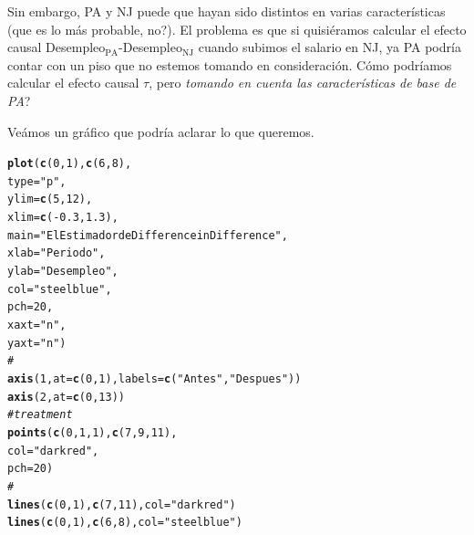 \documentclass[onesided]{article}\usepackage[]{graphicx}\usepackage[]{color}
\makeatletter
\newcommand{\hlnum}[1]{\textcolor[rgb]{0.686,0.059,0.569}{#1}}%
\newcommand{\hlstr}[1]{\textcolor[rgb]{0.192,0.494,0.8}{#1}}%
\newcommand{\hlcom}[1]{\textcolor[rgb]{0.678,0.584,0.686}{\textit{#1}}}%
\newcommand{\hlopt}[1]{\textcolor[rgb]{0,0,0}{#1}}%
\newcommand{\hlstd}[1]{\textcolor[rgb]{0.345,0.345,0.345}{#1}}%
\newcommand{\hlkwc}[1]{\textcolor[rgb]{0.333,0.667,0.333}{#1}}%
\newcommand{\hlkwd}[1]{\textcolor[rgb]{0.737,0.353,0.396}{\textbf{#1}}}%
\newenvironment{kframe}{%
 \def\at@end@of@kframe{}%
 \ifinner\ifhmode%
  \def\at@end@of@kframe{\end{minipage}}%
  \begin{minipage}{\columnwidth}%
 \fi\fi%
 \def\FrameCommand##1{\hskip\@totalleftmargin \hskip-\fboxsep
 \colorbox{shadecolor}{##1}\hskip-\fboxsep
     \hskip-\linewidth \hskip-\@totalleftmargin \hskip\columnwidth}%
 \MakeFramed {\advance\hsize-\width
   \@totalleftmargin\z@ \linewidth\hsize
   \@setminipage}}%
 {\par\unskip\endMakeFramed%
 \at@end@of@kframe}
\newenvironment{knitrout}{}{} %
\makeatother
\begin{document}
Sin embargo, PA y NJ puede que hayan sido distintos en varias caracter\'isticas (que es lo m\'as probable, no?). El problema es que si quisi\'eramos calcular el efecto causal Desempleo$_{\text{PA}}$-Desempleo$_{\text{NJ}}$ cuando subimos el salario en NJ, ya PA podr\'ia contar con un piso que no estemos tomando en consideraci\'on. C\'omo podr\'iamos calcular el efecto causal $\tau$, pero \emph{tomando en cuenta las caracter\'isticas de base de PA}?

Ve\'amos un gr\'afico que podr\'ia aclarar lo que queremos.

\begin{knitrout}
\color{fgcolor}\begin{kframe}
\begin{alltt}
\hlkwd{plot}\hlstd{(}\hlkwd{c}\hlstd{(}\hlnum{0}\hlstd{,} \hlnum{1}\hlstd{),} \hlkwd{c}\hlstd{(}\hlnum{6}\hlstd{,} \hlnum{8}\hlstd{),}
     \hlkwc{type} \hlstd{=} \hlstr{"p"}\hlstd{,}
     \hlkwc{ylim} \hlstd{=} \hlkwd{c}\hlstd{(}\hlnum{5}\hlstd{,} \hlnum{12}\hlstd{),}
     \hlkwc{xlim} \hlstd{=} \hlkwd{c}\hlstd{(}\hlopt{-}\hlnum{0.3}\hlstd{,} \hlnum{1.3}\hlstd{),}
     \hlkwc{main} \hlstd{=} \hlstr{"El Estimador de Difference in Difference"}\hlstd{,}
     \hlkwc{xlab} \hlstd{=} \hlstr{"Periodo"}\hlstd{,}
     \hlkwc{ylab} \hlstd{=} \hlstr{"Desempleo"}\hlstd{,}
     \hlkwc{col} \hlstd{=} \hlstr{"steelblue"}\hlstd{,}
     \hlkwc{pch} \hlstd{=} \hlnum{20}\hlstd{,}
     \hlkwc{xaxt} \hlstd{=} \hlstr{"n"}\hlstd{,}
     \hlkwc{yaxt} \hlstd{=} \hlstr{"n"}\hlstd{)}
\hlcom{#}
\hlkwd{axis}\hlstd{(}\hlnum{1}\hlstd{,} \hlkwc{at} \hlstd{=} \hlkwd{c}\hlstd{(}\hlnum{0}\hlstd{,} \hlnum{1}\hlstd{),} \hlkwc{labels} \hlstd{=} \hlkwd{c}\hlstd{(}\hlstr{"Antes"}\hlstd{,} \hlstr{"Despues"}\hlstd{))}
\hlkwd{axis}\hlstd{(}\hlnum{2}\hlstd{,} \hlkwc{at} \hlstd{=} \hlkwd{c}\hlstd{(}\hlnum{0}\hlstd{,} \hlnum{13}\hlstd{))}
\hlcom{# treatment}
\hlkwd{points}\hlstd{(}\hlkwd{c}\hlstd{(}\hlnum{0}\hlstd{,} \hlnum{1}\hlstd{,} \hlnum{1}\hlstd{),} \hlkwd{c}\hlstd{(}\hlnum{7}\hlstd{,} \hlnum{9}\hlstd{,} \hlnum{11}\hlstd{),}
       \hlkwc{col} \hlstd{=} \hlstr{"darkred"}\hlstd{,}
       \hlkwc{pch} \hlstd{=} \hlnum{20}\hlstd{)}
\hlcom{# }
\hlkwd{lines}\hlstd{(}\hlkwd{c}\hlstd{(}\hlnum{0}\hlstd{,} \hlnum{1}\hlstd{),} \hlkwd{c}\hlstd{(}\hlnum{7}\hlstd{,} \hlnum{11}\hlstd{),} \hlkwc{col} \hlstd{=} \hlstr{"darkred"}\hlstd{)}
\hlkwd{lines}\hlstd{(}\hlkwd{c}\hlstd{(}\hlnum{0}\hlstd{,} \hlnum{1}\hlstd{),} \hlkwd{c}\hlstd{(}\hlnum{6}\hlstd{,} \hlnum{8}\hlstd{),} \hlkwc{col} \hlstd{=} \hlstr{"steelblue"}\hlstd{)}

\end{alltt}
\end{kframe}
\end{knitrout}
\end{document}
